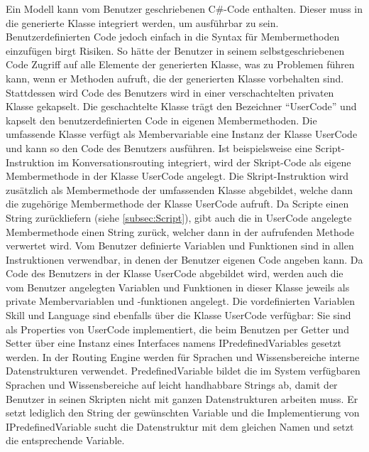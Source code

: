 \newline
Ein Modell kann vom Benutzer geschriebenen C\#-Code enthalten. Dieser muss in die generierte Klasse integriert werden, um ausführbar zu sein. Benutzerdefinierten Code jedoch einfach in die Syntax für Membermethoden einzufügen birgt Risiken. So hätte der Benutzer in seinem selbstgeschriebenen Code Zugriff auf alle Elemente der generierten Klasse, was zu Problemen führen kann, wenn er Methoden aufruft, die der generierten Klasse vorbehalten sind. Stattdessen wird Code des Benutzers wird in einer verschachtelten privaten Klasse gekapselt. Die geschachtelte Klasse trägt den Bezeichner ``UserCode'' und kapselt den benutzerdefinierten Code in eigenen Membermethoden. Die umfassende Klasse verfügt als Membervariable eine Instanz der Klasse UserCode und kann so den Code des Benutzers ausführen. Ist beispielsweise eine Script-Instruktion im Konversationsrouting integriert, wird der Skript-Code als eigene Membermethode in der Klasse UserCode angelegt. Die Skript-Instruktion wird zusätzlich als Membermethode der umfassenden Klasse abgebildet, welche dann die zugehörige Membermethode der Klasse UserCode aufruft. Da Scripte einen String zurückliefern (siehe \ref{subsec:Script}), gibt auch die in UserCode angelegte Membermethode einen String zurück, welcher dann in der aufrufenden Methode verwertet wird.
\newline
Vom Benutzer definierte Variablen und Funktionen sind in allen Instruktionen verwendbar, in denen der Benutzer eigenen Code angeben kann. Da Code des Benutzers in der Klasse UserCode abgebildet wird, werden auch die vom Benutzer angelegten Variablen und Funktionen in dieser Klasse jeweils als private Membervariablen und -funktionen angelegt. Die vordefinierten Variablen Skill und Language sind ebenfalls über die Klasse UserCode verfügbar: Sie sind als Properties von UserCode implementiert, die beim Benutzen per Getter und Setter über eine Instanz eines Interfaces namens IPredefinedVariables gesetzt werden. In der Routing Engine werden für Sprachen und Wissensbereiche interne Datenstrukturen verwendet. PredefinedVariable bildet die im System verfügbaren Sprachen und Wissensbereiche auf leicht handhabbare Strings ab, damit der Benutzer in seinen Skripten nicht mit ganzen Datenstrukturen arbeiten muss. Er setzt lediglich den String der gewünschten Variable und die Implementierung von IPredefinedVariable sucht die Datenstruktur mit dem gleichen Namen und setzt die entsprechende Variable.
\newline
